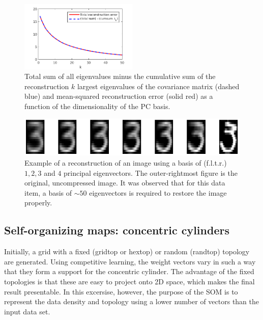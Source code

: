 \documentclass[pdftex,11pt,a4paper]{article}
\begin{document}
\begin{figure}[htb]
\centering
\includegraphics[width=0.5\textwidth]{figs/recon_and_cumsum.png}
\caption{Total sum of all eigenvalues minus the cumulative sum of the reconstruction $k$ largest eigenvalues of the covariance matrix (dashed blue) and mean-squared reconstruction error (solid red) as a function of the dimensionality of the PC basis.\label{fig:recon_and_cumsum}}
\end{figure}


\begin{figure}[htb]
\centering
\includegraphics[width=\textwidth]{figs/reconstruction_steps.png}
\caption{Example of a reconstruction of an image using a basis of (f.l.t.r.) $1,2,3$ and $4$ principal eigenvectors. The outer-rightmost figure is the original, uncompressed image. It was observed that for this data item, a basis of $\sim 50$ eigenvectors is required to restore the image properly.\label{fig:reconstruction_example}}
\end{figure}

\subsection{Self-organizing maps: concentric cylinders}
Initially, a grid with a fixed (gridtop or hextop) or random (randtop) topology are generated. Using competitive learning, the weight vectors vary in such a way that they form a support for the concentric cylinder. The advantage of the fixed topologies is that these are easy to project onto 2D space, which makes the final result presentable. In this excersise, however, the purpose of the SOM is to represent the data density and topology using a lower number of vectors than the input data set.
\end{document}
